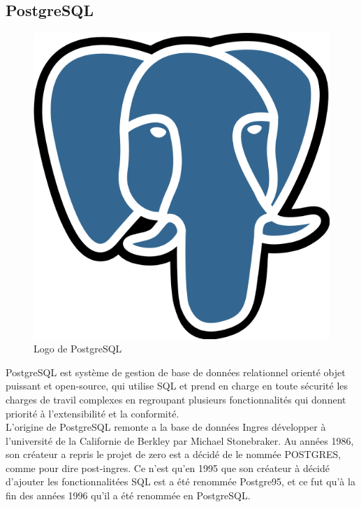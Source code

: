     \subsection{PostgreSQL\cite{postgres}}
    \begin{figure}[H]
        \centering
        \includegraphics[scale=0.2]{ACR/postgresql.png}
        \caption{Logo de PostgreSQL}
    \end{figure}
    
    PostgreSQL est système de gestion de base de données relationnel orienté objet puissant et open-source, qui utilise \acs{SQL} et prend en charge en toute sécurité les charges de travil complexes en regroupant plusieurs fonctionnalités qui donnent priorité à l'extensibilité et la conformité.\\

    L'origine de PostgreSQL remonte a la base de données Ingres développer à l'université de la Californie de Berkley par Michael Stonebraker. Au années 1986, son créateur a repris le projet de zero est a décidé de le nommée POSTGRES, comme pour dire post-ingres. Ce n'est qu'en 1995 que son créateur à décidé d'ajouter les fonctionnalitées \acs{SQL} est a été renommée Postgre95, et ce fut qu'à la fin des années 1996 qu'il a été renommée en PostgreSQL.\\
    
